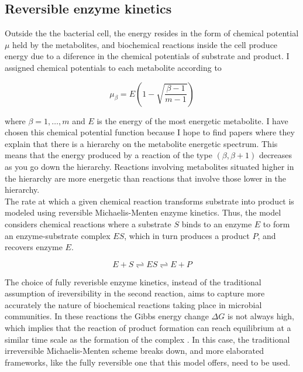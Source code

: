 \documentclass[titlepage,11pt]{article}
\begin{document}
\begin{linenumbers}
				\subsection{Reversible enzyme kinetics}\label{subsed:reversible_enzyme_kinetics}
				Outside the the bacterial cell, the energy resides in the form of chemical potential $ \mu $ held by the metabolites, and biochemical reactions inside the cell produce energy due to a diference in the chemical potentials of substrate and product. I assigned chemical potentials to each metabolite according to
			\begin{linenomath*}	
				\begin{equation}
				\mu_{\beta} = E \left(1 - \sqrt{\frac{\beta-1}{m-1}}\right)
				\end{equation}
			\end{linenomath*}	
			where $ \beta = 1, \dots, m $ and $ E $ is the energy of the most energetic metabolite.
			I have chosen this chemical potential function because I hope to find papers where they explain that there is a hierarchy on the metabolite energetic spectrum. This means that the energy produced by a reaction of the type $ (\beta, \beta+1) $ decreases as you go down the hierarchy. Reactions involving metabolites situated higher in the hierarchy are more energetic than reactions that involve those lower in the hierarchy.\\
			The rate at which a given chemical reaction transforms substrate into product is modeled using reversible Michaelis-Menten enzyme kinetics. Thus, the model considers chemical reactions where a substrate $ S $ binds to an enzyme $ E $ to form an enzyme-substrate complex $ ES $, which in turn produces a product $ P $, and recovers enzyme $ E $. 
			\begin{linenomath*}	
				\begin{equation}\label{eq:react_shceme}
				E + S \rightleftharpoons ES \rightleftharpoons E + P
				\end{equation}	
			\end{linenomath*}
			The choice of fully reverisble enzyme kinetics, instead of the traditional assumption of ireversibility in the second reaction, aims to capture more accurately the nature of biochemical reactions taking place in microbial communities. In these reactions the Gibbs energy change $ \Delta G $ is not always high, which implies that the reaction of product formation can reach equilibrium at a similar time scale as the formation of the complex \citep{Keener2008}. In this case, the traditional irreversible Michaelis-Menten scheme breaks down, and more elaborated frameworks, like the fully reversible one that this model offers, need to be used.\\

\end{linenumbers}
\end{document}

